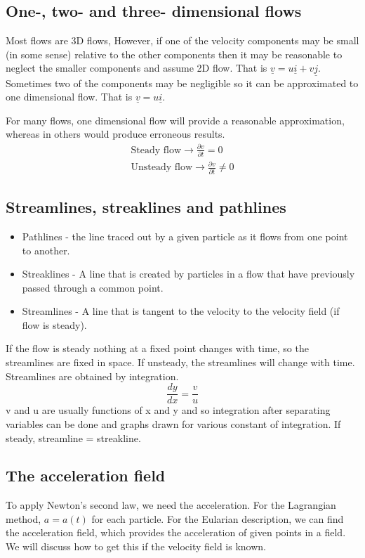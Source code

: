\subsection{One-, two- and three- dimensional flows}
Most flows are 3D flows, However, if one of the velocity components may be small (in some sense) relative to the other components then it may be reasonable to neglect the smaller components and assume 2D flow. That is \( \underline{v} = u\underline{i} + v\underline{j} \). Sometimes two of the components may be negligible so it can be approximated to one dimensional flow. That is \( \underline{v} = u\underline{i} \).

For many flows, one dimensional flow will provide a reasonable approximation, whereas in others would produce erroneous results.
\begin{gather}
  \textrm{Steady flow} \rightarrow \frac{\partial v}{\partial t} = 0\\
  \textrm{Unsteady flow} \rightarrow \frac{\partial v}{\partial t} \neq 0
\end{gather}
\subsection{Streamlines, streaklines and pathlines}
\begin{itemize}[noitemsep]
  \item Pathlines - the line traced out by a given particle as it flows from one point to another.
  \item Streaklines - A line that is created by particles in a flow that have previously passed through a common point.
  \item Streamlines - A line that is tangent to the velocity to the velocity field (if flow is steady).
\end{itemize}
If the flow is steady nothing at a fixed point changes with time, so the streamlines are fixed in space. If unsteady, the streamlines will change with time. Streamlines are obtained by integration.
\begin{equation}
  \frac{dy}{dx} = \frac{v}{u}
\end{equation}
v and u are usually functions of x and y and so integration after separating variables can be done and graphs drawn for various constant of integration. If steady, streamline = streakline.
\subsection{The acceleration field}
To apply Newton's second law, we need the acceleration. For the Lagrangian method, \( a = a(t) \) for each particle. For the Eularian description, we can find the acceleration field, which provides the acceleration of given points in a field. We will discuss how to get this if the velocity field is known.
